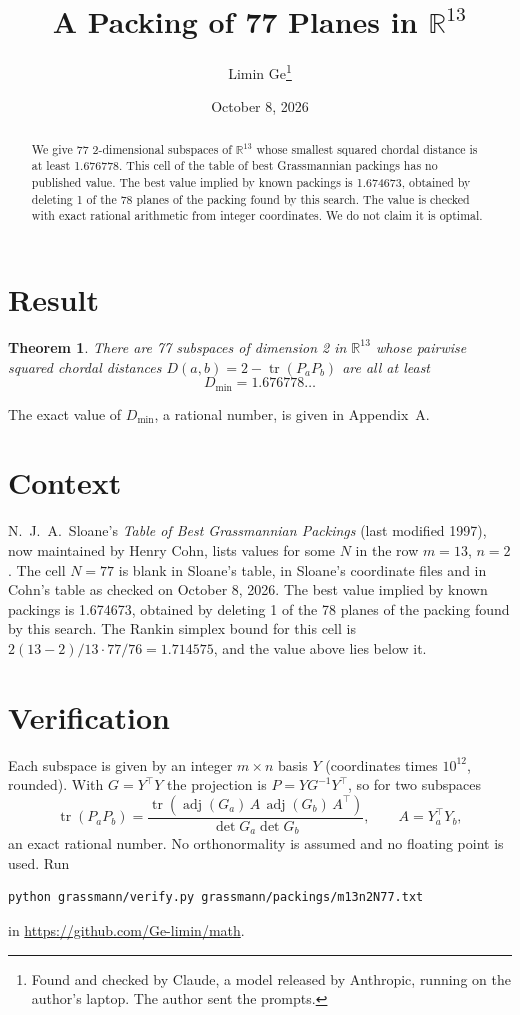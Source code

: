 \documentclass[11pt,a4paper]{article}
\title{A Packing of 77 Planes in $\mathbb{R}^{13}$}
\author{Limin Ge\thanks{Found and checked by Claude, a model released by Anthropic, running on the author's laptop. The author sent the prompts.}}
\date{October 8, 2026}
\newtheorem*{theorem}{Theorem}
\begin{document}
\maketitle
\begin{abstract}
We give 77 2-dimensional subspaces of $\mathbb{R}^{13}$ whose smallest squared chordal distance is at least 1.676778. This cell of the table of best Grassmannian packings has no published value. The best value implied by known packings is 1.674673, obtained by deleting 1 of the 78 planes of the packing found by this search. The value is checked with exact rational arithmetic from integer coordinates. We do not claim it is optimal.
\end{abstract}

\section{Result}
\begin{theorem}
There are 77 subspaces of dimension 2 in $\mathbb{R}^{13}$ whose pairwise squared chordal distances $D(a,b) = 2 - \operatorname{tr}(P_aP_b)$ are all at least
\[ D_{\min} = 1.676778\ldots \]
\end{theorem}
The exact value of $D_{\min}$, a rational number, is given in Appendix~A.


\section{Context}
N.~J.~A.~Sloane's \emph{Table of Best Grassmannian Packings} (last modified 1997), now maintained by Henry Cohn, lists values for some $N$ in the row $m=13$, $n=2$. The cell $N=77$ is blank in Sloane's table, in Sloane's coordinate files and in Cohn's table as checked on October 8, 2026. The best value implied by known packings is 1.674673, obtained by deleting 1 of the 78 planes of the packing found by this search. The Rankin simplex bound for this cell is $2(13-2)/13\cdot 77/76 = 1.714575$, and the value above lies below it.


\section{Verification}
Each subspace is given by an integer $m\times n$ basis $Y$ (coordinates times $10^{12}$, rounded). With $G=Y^\top Y$ the projection is $P=YG^{-1}Y^\top$, so for two subspaces
\[ \operatorname{tr}(P_aP_b)=\frac{\operatorname{tr}(\operatorname{adj}(G_a)\,A\,\operatorname{adj}(G_b)\,A^\top)}{\det G_a\det G_b},\qquad A=Y_a^\top Y_b, \]
an exact rational number. No orthonormality is assumed and no floating point is used. Run
\begin{verbatim}
python grassmann/verify.py grassmann/packings/m13n2N77.txt
\end{verbatim}
in \url{https://github.com/Ge-limin/math}.
\end{document}
